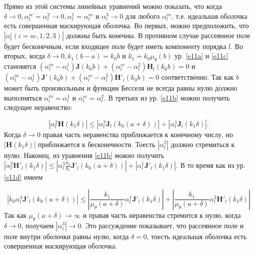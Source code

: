 \documentclass[a4paper, 12pt]{article}
\begin{document}
Прямо из этой системы линейных уравнений можно показать, что когда $\delta \to 0, \alpha_l^{sc}=\alpha_l^{2} \to 0, 
\alpha_l^1=\alpha_l^{in}$ и $\alpha_l^3 \to 0$ для любого $\alpha_l^{in}$, т.е. идеальная оболочка есть совершенная 
маскирующая оболочка. Во первых, можно предположить, что $\left| \alpha_l^i(i=sc,1,2,3) \right|$ должны быть конечны.
В противном случае рассеянное поле будет бесконечным, если входящее поле будет иметь компоненту порядка $l$. Во вторых,
когда $\delta \to 0, k_1(b-a)=k_0 b$ и $k_1=k_0 \mu_\theta(b)$ ур. \eqref{e11a} и \eqref{e11c} становятся 
$(\alpha_l^{in}-\alpha_l^1)\mathbf{J}(k_0 b) + (\alpha_l^{sc}-\alpha_l^2)\mathbf{H}_l(k_0 b) = 0$ и 
$(\alpha_l^{in}-\alpha_l^1)\mathbf{J'}(k_0 b) + (\alpha_l^{sc}-\alpha_l^2)\mathbf{H'}_l(k_0 b) = 0$ соответственно.
Так как $b$ может быть произвольным и функции Бесселя не всегда равны нулю должно выполняться $\alpha_l^{in}=\alpha_l^1$ и
$\alpha_l^{sc}=\alpha_l^2$. В третьих из ур. \eqref{e11b} можно получить следущее неравенство:


\begin{equation}\label{e12}
	\left| \alpha_l^2\mathbf{H}(k_1 \delta) \right| \le \left| \alpha_l^3 \mathbf{J}_l(k_0(a+\delta)) \right| + 
	\left| \alpha_l^1 \mathbf{J}_l(k_1 \delta) \right|. 
\end{equation}
Когда $\delta \to 0$ правая часть неравенства приближается к конечному числу, но $\left| \mathbf{H}(k_1 \delta) \right|$ 
приближается к бесконечности. Тоесть $\left| \alpha_l^2 \right|$ должно стремиться к нулю. Наконец, из уравнения 
\eqref{e11b} можно получить $\left| \alpha_l^2 \mathbf{H'}_l(k_1 \delta) \right| \le \left| \alpha_l^3 \frac{k_0}{k_1}
\mathbf{J'}_l(k_0(a+\delta))\right|+\left| \alpha_l^1\mathbf{J'}_l(k_1 \delta)\right|$. В то время как из ур. \eqref{e11d} 
имеем

\begin{equation}\label{e13}
	\left| k_0 \alpha_l^3 \mathbf{J'}_l(k_0(a+\delta))\right| \le
	\left| \frac{k_1}{\mu_\theta(a+\delta)}\alpha_l^1 \mathbf{J'}_l(k_1 \delta) \right| + 
	\left| \frac{k_1}{\mu_\theta(a+\delta)}\alpha_l^2 \mathbf{H'}_l(k_1 \delta) \right|
\end{equation}
Так как $\mu_\theta(a+\delta) \to \infty$ и правая часть неравенства стремится к нулю, когда $\delta \to 0$, получаем
$|\alpha_l^3| \to 0$. Это рассуждение показывает, что рассеянное поле и поле внутри оболочки равны нулю, когда $\delta=0$,
тоесть идеальная оболочка есть совершенная маскирующая оболочка.
\end{document}
